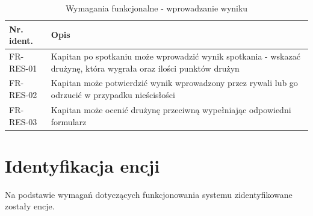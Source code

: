 \begin{table}[H]
\centering\small
\caption{Wymagania funkcjonalne - wprowadzanie wyniku}
\label{tab:szablon}
\begin{tabularx}{\linewidth}{|p{.2\linewidth}|X|}\hline
Nr. ident. & Opis \\ \hline\hline

FR-RES-01 & Kapitan po spotkaniu może wprowadzić wynik spotkania - wskazać drużynę, która wygrała oraz ilości punktów drużyn  \\ \hline
FR-RES-02 & Kapitan może potwierdzić wynik wprowadzony przez rywali lub go odrzucić w przypadku nieścisłości  \\ \hline
FR-RES-03 & Kapitan może ocenić drużynę przeciwną wypełniając odpowiedni formularz \\ \hline

\end{tabularx}
\end{table}

\section{Identyfikacja encji}

Na podstawie wymagań dotyczących funkcjonowania systemu zidentyfikowane zostały encje.


